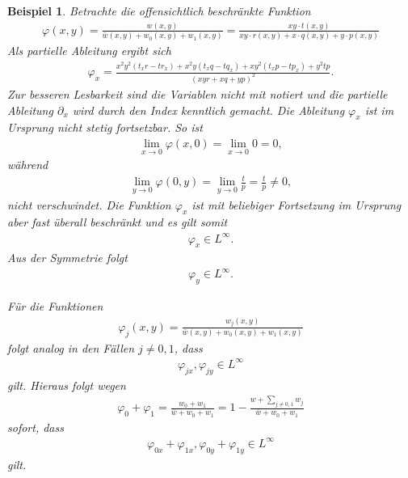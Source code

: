 \documentclass[10pt,a4paper,oneside]{report}
\newtheorem{beispiel}{Beispiel}[chapter]
\begin{document}
\begin{beispiel}
Betrachte die offensichtlich beschränkte Funktion 
\begin{align*}
\varphi\left(x,y\right) = \frac{w\left(x,y\right)}{\bar{w}\left(x,y\right) + w_0\left(x,y\right)+ w_1 \left(x,y\right)} = \frac{xy\cdot t\left(x,y\right)}{xy\cdot r\left(x,y\right) + x\cdot q\left(x,y\right)+ y \cdot p \left(x,y\right)}
\end{align*}
Als partielle Ableitung ergibt sich
\begin{align*}
\varphi_{x} = \frac{x^2y^2 \left(t_x r - t r_x\right)+ x^2 y \left(t_x q -t q_x\right) + x y^2 \left( t_x p - t p_x\right)+ y^2 t p}{\left(xy r + x q+ y p \right)^2}.
\end{align*}
Zur besseren Lesbarkeit sind die Variablen nicht mit notiert und die partielle Ableitung $\partial_x$ wird durch den Index kenntlich gemacht.
Die Ableitung $\varphi_{x}$ ist im Ursprung nicht stetig fortsetzbar.
So ist 
\begin{align*}
\lim_{x \to 0} \varphi \left(x, 0\right) = \lim_{x \to 0} 0 = 0, 
\end{align*}
während
\begin{align*}
\lim_{y \to 0} \varphi \left(0, y\right) = \lim_{y \to 0} \frac{t}{p}= \frac{t}{p} \neq 0,
\end{align*}
nicht verschwindet.
Die Funktion $\varphi_{x}$ ist mit beliebiger Fortsetzung im Ursprung aber fast überall beschränkt und es gilt somit
\begin{align*}
\varphi_{x} \in L^{\infty}.
\end{align*}
Aus der Symmetrie folgt 
\begin{align*}
\varphi_{y} \in L^{\infty}.
\end{align*}

Für die Funktionen
\begin{align*}
\varphi_j\left(x,y\right) = \frac{w_j\left(x,y\right)}{\bar{w}\left(x,y\right) + w_0\left(x,y\right)+ w_1 \left(x,y\right)} 
\end{align*}
folgt analog in den Fällen $j \neq 0,1$, dass
\begin{align*}
\varphi_{j x}, \varphi_{j y} \in L^{\infty}
\end{align*}
gilt.
Hieraus folgt wegen
\begin{align*}
\varphi_0 + \varphi_1 = \frac{w_0+w_1}{\bar{w}+ w_0 + w_1} = 1 - \frac{w + \sum_{j\neq 0,1} w_j}{\bar{w}+ w_0 + w_1}
\end{align*}
sofort, dass
\begin{align*}
\varphi_{0 x} + \varphi_{1 x}, \varphi_{0 y} + \varphi_{1 y} \in L^{\infty}
\end{align*}
gilt.


\end{beispiel}
\end{document}
